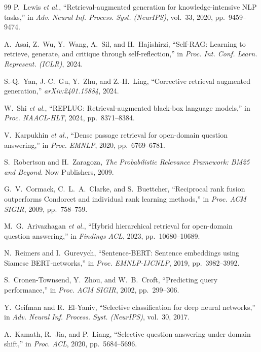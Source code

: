 \documentclass[conference]{IEEEtran}
\begin{document}
\begin{thebibliography}{99}
 P.~Lewis \textit{et al.}, ``Retrieval-augmented
generation for knowledge-intensive NLP tasks,'' in \textit{Adv. Neural
Inf. Process. Syst. (NeurIPS)}, vol.~33, 2020, pp.~9459--9474.

 A.~Asai, Z.~Wu, Y.~Wang, A.~Sil, and
H.~Hajishirzi, ``Self-RAG: Learning to retrieve, generate, and critique
through self-reflection,'' in \textit{Proc. Int. Conf. Learn. Represent.
(ICLR)}, 2024.

 S.-Q.~Yan, J.-C.~Gu, Y.~Zhu, and Z.-H.~Ling,
``Corrective retrieval augmented generation,'' \textit{arXiv:2401.15884},
2024.

 W.~Shi \textit{et al.}, ``REPLUG:
Retrieval-augmented black-box language models,'' in \textit{Proc. NAACL-HLT},
2024, pp.~8371--8384.

 V.~Karpukhin \textit{et al.}, ``Dense passage
retrieval for open-domain question answering,'' in \textit{Proc. EMNLP},
2020, pp.~6769--6781.

 S.~Robertson and H.~Zaragoza, \textit{The
Probabilistic Relevance Framework: BM25 and Beyond}. Now Publishers,
2009.

 G.~V.~Cormack, C.~L.~A.~Clarke, and S.~Buettcher,
``Reciprocal rank fusion outperforms Condorcet and individual rank
learning methods,'' in \textit{Proc. ACM SIGIR}, 2009, pp.~758--759.

 M.~G.~Arivazhagan \textit{et al.}, ``Hybrid
hierarchical retrieval for open-domain question answering,'' in
\textit{Findings ACL}, 2023, pp.~10680--10689.

 N.~Reimers and I.~Gurevych, ``Sentence-BERT:
Sentence embeddings using Siamese BERT-networks,'' in \textit{Proc.
EMNLP-IJCNLP}, 2019, pp.~3982--3992.

 S.~Cronen-Townsend, Y.~Zhou, and W.~B.~Croft,
``Predicting query performance,'' in \textit{Proc. ACM SIGIR}, 2002,
pp.~299--306.

 Y.~Geifman and R.~El-Yaniv, ``Selective
classification for deep neural networks,'' in \textit{Adv. Neural Inf.
Process. Syst. (NeurIPS)}, vol.~30, 2017.

 A.~Kamath, R.~Jia, and P.~Liang, ``Selective
question answering under domain shift,'' in \textit{Proc. ACL}, 2020,
pp.~5684--5696.


\end{thebibliography}
\end{document}
